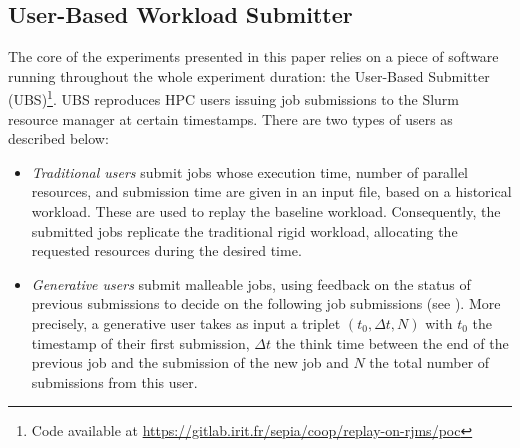 \documentclass[a4paper,fleqn]{cas-dc}
\begin{document}

\subsection{User-Based Workload Submitter}
\label{subsec:submitter}

The core of the experiments presented in this paper relies on a piece of software running throughout the whole experiment duration: the User-Based Submitter (UBS)\footnote{Code available at \url{https://gitlab.irit.fr/sepia/coop/replay-on-rjms/poc}}.
UBS reproduces HPC users issuing job submissions to the Slurm resource manager at certain timestamps.
There are two types of users as described below:
\begin{itemize}[wide]
    \item \textit{Traditional users} submit jobs whose execution time, number of parallel resources, and submission time are given in an input file, based on a historical workload.
    These are used to replay the baseline workload.
    Consequently, the submitted jobs replicate the traditional rigid workload, allocating the requested resources during the desired time.

    \item \textit{Generative users} submit malleable jobs, using feedback on the status of previous submissions to decide on the following job submissions (see \cite{madon_replay_2024}).
    More precisely, a generative user takes as input a triplet $(t_0, \Delta t, N)$
    with $t_0$ the timestamp of their first submission,
    $\Delta t$ the think time between the end of the previous job and the submission of the new job and $N$ the total number of submissions from this user.
\end{itemize}
\end{document}
